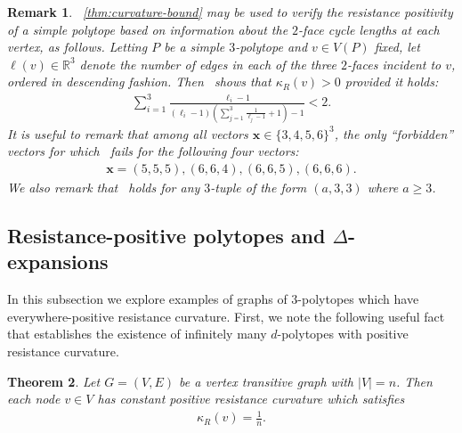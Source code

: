 \documentclass[11pt,a4paper]{amsart}
\newcommand{\resistance}[1]{\kappa_R\left({#1}\right)}
\newtheorem{theorem}{Theorem}[section]
\newtheorem{remark}[theorem]{Remark}
\begin{document}
\begin{remark}\label{rmk:curvature-test}
   ~\cref{thm:curvature-bound} may be used to verify the resistance positivity of a simple polytope based on information about the $2$-face cycle lengths at each vertex, as follows. Letting $P$ be a simple $3$-polytope and $v\in V(P)$ fixed, let $\boldsymbol\ell(v)\in\mathbb{R}^3$ denote the number of edges in each of the three $2$-faces incident to $v$, ordered in descending fashion. Then~ shows that $\resistance{v} > 0$ provided it holds:
        \begin{align}\label{eq:test-for-positive}
            \sum_{i=1}^3
                \frac{\boldsymbol\ell_i-1}{
                    (\boldsymbol\ell_i-1)\!\left(\sum_{j=1}^3\frac{1}{\boldsymbol\ell_{j}-1}+1\right)-1} < 2.
        \end{align}
    It is useful to remark that among all vectors $\mathbf{x}\in \{3, 4, 5, 6\}^3$, the only ``forbidden'' vectors for which~ fails for the following four vectors:
        \begin{align}\label{eq:forbidden}
            \mathbf{x} = (5, 5, 5), (6, 6, 4), (6, 6, 5), (6, 6, 6).
        \end{align}
    We also remark that~ holds for any $3$-tuple of the form $(a, 3, 3)$ where $a\ge 3$.
\end{remark}

\subsection{Resistance-positive polytopes and $\Delta$-expansions}\label{subsec:resistance-positive-polyhedra}

In this subsection we explore examples of graphs of $3$-polytopes which have everywhere-positive resistance curvature. First, we note the following useful fact that establishes the existence of infinitely many $d$-polytopes with positive resistance curvature. 

\begin{theorem}\label{thm:resis-curv-transitive}
    Let $G=(V, E)$ be a vertex transitive graph with $|V| =n$. Then each node $v\in V$ has constant positive resistance curvature which satisfies
        \begin{align*}
            \resistance{v} =\frac{1}{n}.
        \end{align*}
\end{theorem}
\end{document}
